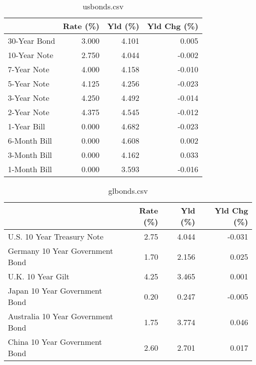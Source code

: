 \documentclass{article}%
\begin{document}
%


\begin{table}[htbp]%
\caption{usbonds.csv}%
\centering%
\begin{adjustbox}{width=1\textwidth}%
\begin{tabular}{lrrr}
\toprule
             &  Rate (\%) &  Yld (\%) &  Yld Chg (\%) \\
\midrule
30-Year Bond &     3.000 &    4.101 &        0.005 \\
10-Year Note &     2.750 &    4.044 &       -0.002 \\
 7-Year Note &     4.000 &    4.158 &       -0.010 \\
 5-Year Note &     4.125 &    4.256 &       -0.023 \\
 3-Year Note &     4.250 &    4.492 &       -0.014 \\
 2-Year Note &     4.375 &    4.545 &       -0.012 \\
 1-Year Bill &     0.000 &    4.682 &       -0.023 \\
6-Month Bill &     0.000 &    4.608 &        0.002 \\
3-Month Bill &     0.000 &    4.162 &        0.033 \\
1-Month Bill &     0.000 &    3.593 &       -0.016 \\
\bottomrule
\end{tabular}
%
\end{adjustbox}%
\end{table}

%


\begin{table}[htbp]%
\caption{glbonds.csv}%
\centering%
\begin{adjustbox}{width=1\textwidth}%
\begin{tabular}{lrrr}
\toprule
                                  &  Rate (\%) &  Yld (\%) &  Yld Chg (\%) \\
\midrule
       U.S. 10 Year Treasury Note &      2.75 &    4.044 &       -0.031 \\
  Germany 10 Year Government Bond &      1.70 &    2.156 &        0.025 \\
                U.K. 10 Year Gilt &      4.25 &    3.465 &        0.001 \\
    Japan 10 Year Government Bond &      0.20 &    0.247 &       -0.005 \\
Australia 10 Year Government Bond &      1.75 &    3.774 &        0.046 \\
    China 10 Year Government Bond &      2.60 &    2.701 &        0.017 \\
\bottomrule
\end{tabular}
%
\end{adjustbox}%
\end{table}
\end{document}
